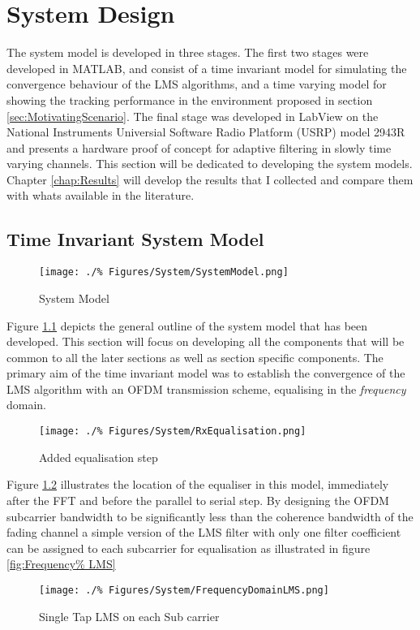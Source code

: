\chapter{System Design}

The system model is developed in three stages. %
The first two stages were developed in MATLAB, %
and consist of a time invariant model %
for simulating the convergence behaviour of %
the LMS algorithms, and a time varying %
model for showing the tracking performance %
in the environment proposed in section %
\ref{sec:MotivatingScenario}. The %
final stage was developed in LabView on the %
National Instruments Universial Software Radio %
Platform (USRP) model 2943R and presents %
a hardware proof of concept for adaptive %
filtering in slowly time varying channels. %
This section will be dedicated to developing %
the system models. Chapter \ref{chap:Results} %
will develop the results that I collected %
and compare them with whats available in the %
literature.

\section{Time Invariant System Model}
\label{sec:TIModel}
\FloatBarrier
\begin{figure}[ht]
	\texttt{[image: ./\%
	Figures/System/SystemModel.png]}
	\caption{System Model}
	\label{fig:SysModel}
\end{figure}
Figure \ref{fig:SysModel} depicts the general %
outline of the system model that has been %
developed. This section will focus on %
developing all the components that will %
be common to all the later sections as %
well as section specific components.
\FloatBarrier
The primary aim of the time invariant %
model was to establish the convergence %
of the LMS algorithm with an OFDM %
transmission scheme, equalising in the %
\emph{frequency} domain.
\begin{figure}[ht]
	\texttt{[image: ./\%
	Figures/System/RxEqualisation.png]}
	\caption{Added equalisation step}
	\label{fig:RxEqualiser}
\end{figure}
Figure \ref{fig:RxEqualiser} illustrates %
the location of the equaliser in this model, %
immediately after the FFT and before the %
parallel to serial step. By designing %
the OFDM subcarrier bandwidth to be %
significantly less than the coherence %
bandwidth of the fading channel a simple %
version of the LMS filter with only one %
filter coefficient can be assigned to %
each subcarrier for equalisation as %
illustrated in figure \ref{fig:Frequency%
LMS}
\FloatBarrier
\begin{figure}[ht]
	\centering
	\texttt{[image: ./\%
	Figures/System/FrequencyDomainLMS.png]}
	\caption{Single Tap LMS on each Sub%
	carrier}
	\label{fig:FrequencyLMS}
\end{figure}
\FloatBarrier
